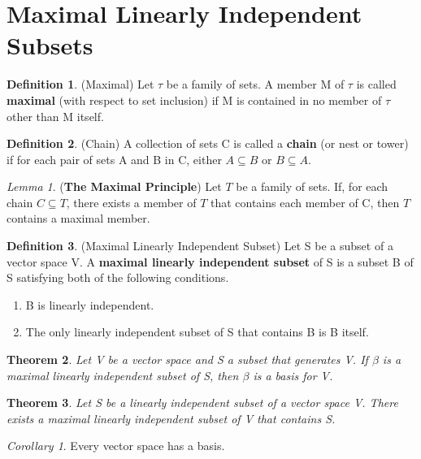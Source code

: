 \documentclass[12pt]{article}
\newtheorem{theorem}{Theorem}[section]
\theoremstyle{definition}
\newtheorem{definition}{Definition}[section]
\theoremstyle{remark}
\newtheorem{corollary}{Corollary}[theorem]
\newtheorem{lemma}[theorem]{Lemma}
\begin{document}
\section{Maximal Linearly Independent Subsets}
    \begin{definition}(Maximal)
        Let $\tau$ be a family of sets. A member M of $\tau$ is called \textbf{maximal} (with respect to set inclusion) if M is contained in no 
        member of $\tau$ other than M itself.
    \end{definition}

    \begin{definition}(Chain)
        A collection of sets C is called a \textbf{chain} (or nest or tower) if for each pair of sets A and B in C, either $A\subseteq B$ or $B \subseteq A$.
    \end{definition}

    \begin{lemma}(\textbf{The Maximal Principle})
        Let $T$ be a family of sets. If, for each chain $C\subseteq T$, there exists a member of $T$ that 
        contains each member of C, then $T$ contains a maximal member.
    \end{lemma}

    \begin{definition}(Maximal Linearly Independent Subset)
        Let S be a subset of a vector space V. A \textbf{maximal linearly independent subset} of S is a subset 
        B of S satisfying both of the following conditions.
        \begin{enumerate}
            \item B is linearly independent.
            \item The only linearly independent subset of S that contains B is B itself.
        \end{enumerate}
    \end{definition}

    \begin{theorem}
        Let V be a vector space and S a subset that generates V. If $\beta$ is a maximal 
        linearly independent subset of S, then $\beta$ is a basis for V.
    \end{theorem}

    \begin{theorem}
        Let S be a linearly independent subset of a vector space V. There exists a 
        maximal linearly independent subset of V that contains S.
    \end{theorem}
    \begin{corollary}
        Every vector space has a basis.
    \end{corollary}
\end{document}
